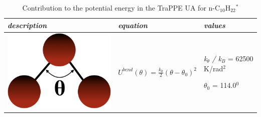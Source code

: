 \documentclass[9pt,bestpractices]{livecoms}
\begin{document}
\begin{table}
  \caption{Contribution to the potential energy in the TraPPE UA for n-C$_{10}$H$_{22}$$^{\mathrm{*}}$}
\begin{tabularx}{\textwidth}{
p{}
p{}
p{}}
\centering\arraybackslash{}\textit{description} & \centering\arraybackslash{}\textit{equation} & \centering\arraybackslash{}\textit{values} \\
\midrule
\includegraphics[width=\linewidth]{gfx/image30.png} & $U^{bend}\left(\theta\right)=\frac{k_{\theta}}{2}\left(\theta-\theta_{0}\right)^{2}$ & \textit{k}$_{{\theta}}$ \textit{/ k}$_{B}$ = 62500 K/rad$^{2}$ \par ${\theta}$$_{0}$ = 114.0$^{0}$ \\


\end{tabularx}
\end{table}
\end{document}
